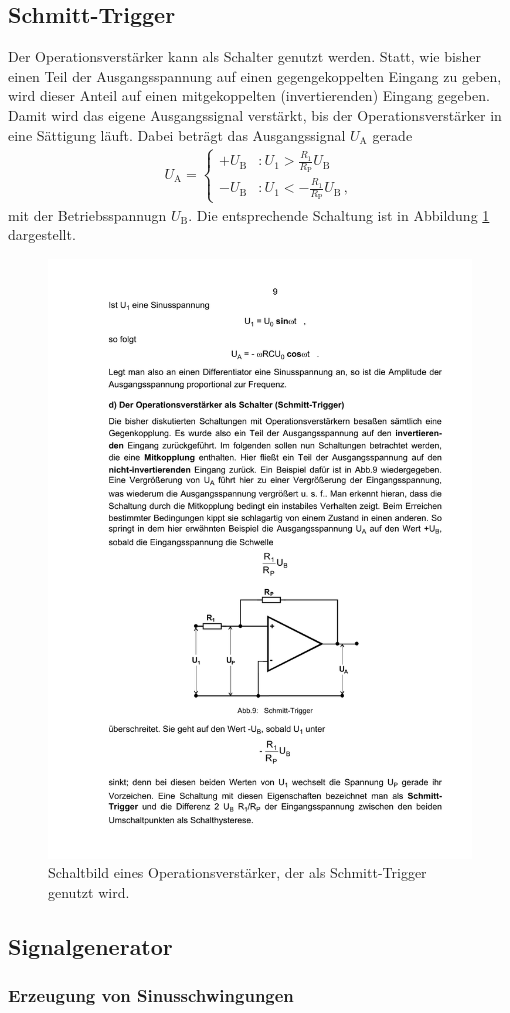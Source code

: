 \subsection{Schmitt-Trigger}
\label{subsec:schmitt_trigger}
Der Operationsverstärker kann als Schalter genutzt werden. Statt, wie bisher
einen Teil der Ausgangsspannung auf einen gegengekoppelten Eingang zu geben,
wird dieser Anteil auf einen mitgekoppelten (invertierenden) Eingang gegeben.
Damit wird das eigene Ausgangssignal verstärkt, bis der Operationsverstärker
in eine Sättigung läuft.
Dabei beträgt das Ausgangssignal $U_\text{A}$ gerade
\begin{align*}
    U_\text{A} = 
    \begin{cases}
        +U_\text{B} &: U_1 > \frac{R_1}{R_\text{P}}U_\text{B} \\
        -U_\text{B} &: U_1 < -\frac{R_1}{R_\text{P}}U_\text{B}\,,
    \end{cases}
\end{align*}
mit der Betriebsspannugn $U_\text{B}$.
Die entsprechende Schaltung ist in Abbildung \ref{fig:schmitt_trigger}
dargestellt.
\begin{figure}
    \centering
    \includegraphics[width=0.7\linewidth]{img/schmitt_trigger.pdf}
    \caption{
        Schaltbild eines Operationsverstärker, der als Schmitt-Trigger
        genutzt wird.
    }
    \label{fig:schmitt_trigger}
\end{figure}

\subsection{Signalgenerator}
\label{subsec:signalgenerator}

\subsubsection{Erzeugung von Sinusschwingungen}
\label{subsubsec:sinusschwingungen}

